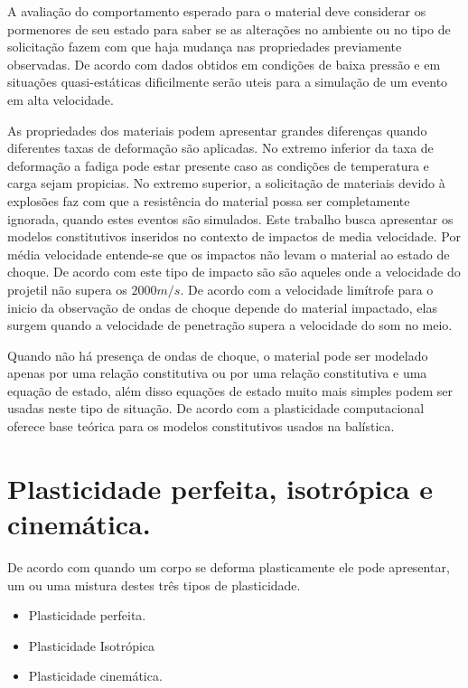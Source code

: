  A avaliação do comportamento esperado para o material deve considerar os pormenores de seu estado para saber se as alterações no ambiente ou no tipo de solicitação fazem com que haja mudança nas propriedades previamente observadas. De acordo com \cite{Zukas} dados obtidos em condições de baixa pressão e em situações quasi-estáticas dificilmente serão uteis para a simulação de um evento em alta velocidade. \par

As propriedades dos materiais podem apresentar grandes diferenças quando diferentes taxas de deformação são aplicadas. No extremo inferior da taxa de deformação a fadiga pode estar presente caso as condições de temperatura e carga sejam propicias. No extremo superior, a solicitação de materiais devido à explosões faz com que a resistência do material possa ser completamente ignorada, quando estes eventos são simulados. Este trabalho busca apresentar os modelos constitutivos inseridos no contexto de impactos de media velocidade. Por média velocidade entende-se que os impactos não levam o material ao estado de choque. De acordo com \cite{Zukas} este tipo de impacto são são aqueles onde a velocidade do projetil não supera os $2000 m/s$. De acordo com \cite{Hazell} a velocidade limítrofe para o inicio da observação de ondas de choque depende do material impactado, elas surgem quando a velocidade de penetração supera a velocidade do som no meio. \par


Quando não há presença de ondas de choque, o material pode ser modelado apenas por uma relação constitutiva ou por uma relação constitutiva e uma equação de estado, além disso equações de estado muito mais simples podem ser usadas neste tipo de situação. De acordo com \cite{hiermaier_2008} a plasticidade computacional oferece base teórica para os modelos constitutivos usados na balística. \\

\section{Plasticidade perfeita, isotrópica e cinemática.}

De acordo com \cite{neto_peric_owens_2008} quando um corpo se deforma plasticamente ele pode apresentar, um ou uma mistura destes três tipos de plasticidade. 
\begin{itemize}
    \item Plasticidade perfeita.
    \item Plasticidade Isotrópica
    \item Plasticidade cinemática.
\end{itemize}
\par

